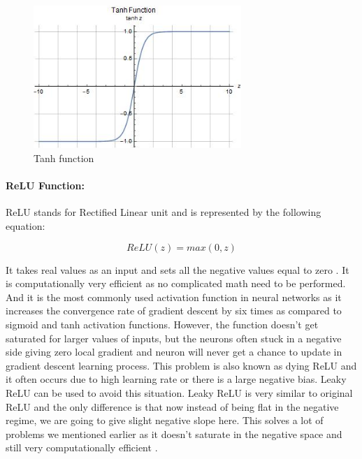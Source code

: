 \begin{figure}[H]
	\centering
		\includegraphics[width=0.70\textwidth]{CHAPTERS/Chapter-3/Images/3.8.jpg}
	\caption{Tanh function}
	\label{fig:3.8}
\end{figure}

\paragraph*{ReLU Function:}
ReLU stands for Rectified Linear unit and is represented by the following equation:

\begin{equation}
	ReLU(z) = max(0,z)
\end{equation}

It takes real values as an input and sets all the negative 
values equal to zero \cite{chap_3_article:3}. It is computationally very efficient as no 
complicated math need to be performed. And it is the most commonly used 
activation function in neural networks as it increases the convergence rate 
of gradient descent by six times as compared to sigmoid and tanh activation 
functions. However, the function doesn’t get saturated for larger values of 
inputs, but the neurons often stuck in a negative side giving zero local gradient 
and neuron will never get a chance to update in gradient descent learning process. 
This problem is also known as dying ReLU and it often occurs due to high learning 
rate or there is a large negative bias. Leaky ReLU can be used to avoid this 
situation. Leaky ReLU is very similar to original ReLU and the only difference 
is that now instead of being flat in the negative regime, we are going to give 
slight negative slope here. This solves a lot of problems we mentioned earlier
as it doesn’t saturate in the negative space and still very computationally efficient \cite{chap_3_article:3}.


